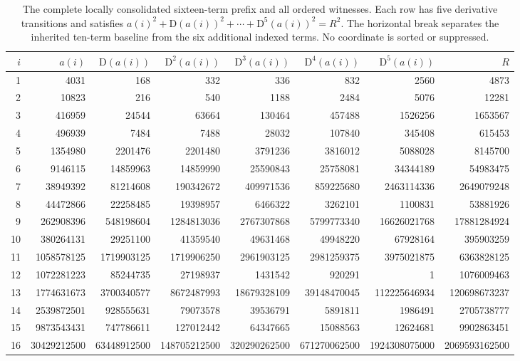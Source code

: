 \documentclass[11pt,a4paper]{article}
\newcommand{\D}{\mathrm{D}}
\theoremstyle{definition}
\theoremstyle{remark}
\begin{document}
\begin{table}[htbp]
\centering\scriptsize
\setlength{\tabcolsep}{3pt}
\begin{tabular}{rrrrrrrr}
\toprule
$i$&$a(i)$&$\D(a(i))$&$\D^2(a(i))$&$\D^3(a(i))$&$\D^4(a(i))$&$\D^5(a(i))$&$R$\\
\midrule
1&4031&168&332&336&832&2560&4873\\
2&10823&216&540&1188&2484&5076&12281\\
3&416959&24544&63664&130464&457488&1526256&1653567\\
4&496939&7484&7488&28032&107840&345408&615453\\
5&1354980&2201476&2201480&3791236&3816012&5088028&8145700\\
6&9146115&14859963&14859990&25590843&25758081&34344189&54983475\\
7&38949392&81214608&190342672&409971536&859225680&2463114336&2649079248\\
8&44472866&22258485&19398957&6466322&3262101&1100831&53881926\\
9&262908396&548198604&1284813036&2767307868&5799773340&16626021768&17881284924\\
10&380264131&29251100&41359540&49631468&49948220&67928164&395903259\\
\midrule
11&1058578125&1719903125&1719906250&2961903125&2981259375&3975021875&6363828125\\
12&1072281223&85244735&27198937&1431542&920291&1&1076009463\\
13&1774631673&3700340577&8672487993&18679328109&39148470045&112225646934&120698673237\\
14&2539872501&928555631&79073578&39536791&5891811&1986491&2705738777\\
15&9873543431&747786611&127012442&64347665&15088563&12624681&9902863451\\
16&30429212500&63448912500&148705212500&320290262500&671270062500&1924308075000&2069593162500\\
\bottomrule
\end{tabular}
\caption{The complete locally consolidated sixteen-term prefix and all
ordered witnesses. Each row has five derivative transitions and satisfies
$a(i)^2+\D(a(i))^2+\cdots+\D^5(a(i))^2=R^2$. The horizontal break separates
the inherited ten-term baseline from the six additional indexed terms.
No coordinate is sorted or suppressed.}\label{tab:witnesses}
\end{table}
\end{document}
